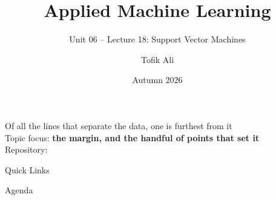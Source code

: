 \documentclass[aspectratio=169]{beamer}
\title[Applied Machine Learning]{Applied Machine Learning}
\subtitle{Unit 06 -- Lecture 18: Support Vector Machines}
\author{Tofik Ali}
\institute{School of Computer Science, UPES Dehradun}
\date{Autumn 2026}
\begin{document}
\UPESCoverFrame
\setcounter{framenumber}{0}

\begin{frame}
  \titlepage
  \begin{center}
    \footnotesize Of all the lines that separate the data, one is furthest
    from it\\[0.25em]
    \footnotesize Topic focus: \textbf{the margin, and the handful of points
    that set it}\\[0.25em]
    \footnotesize Repository: \texttt{\AMLRepoURL}
  \end{center}
  \slidesources{\AMLUnitVISources}
\end{frame}

\begin{frame}{Quick Links}
  \centering
  \hyperlink{sec:margin}{}\hspace{0.4em}
  \hyperlink{sec:dual}{}\hspace{0.4em}
  \hyperlink{sec:sv}{}\hspace{0.4em}
  \hyperlink{sec:soft}{}\\[0.6em]
  \hyperlink{sec:hinge}{}\hspace{0.4em}
  \hyperlink{sec:kernel}{}\hspace{0.4em}
  \hyperlink{sec:practice}{}\hspace{0.4em}
  \hyperlink{sec:summary}{}
\end{frame}

\begin{frame}{Agenda}
  \tableofcontents
\end{frame}
\end{document}
